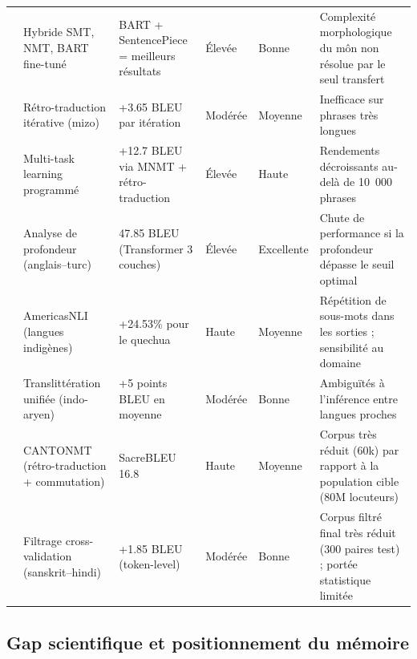 \begin{longtable}{p{2.8cm}p{2.8cm}p{2.2cm}p{1.9cm}p{1.9cm}p{3.2cm}}
\citeauthor{tun2025exploring} \cite{tun2025exploring} &
Hybride SMT, NMT, BART fine-tuné &
BART + \ac{SentencePiece} = meilleurs résultats &
Élevée &
Bonne &
Complexité morphologique du môn non résolue par le seul transfert \\
\citeauthor{ahmed2023guit} \cite{ahmed2023guit} &
Rétro-traduction itérative (mizo) &
+3.65 \ac{BLEU} par itération &
Modérée &
Moyenne &
Inefficace sur phrases très longues \\
\citeauthor{gronroos2020transfer} \cite{gronroos2020transfer} &
Multi-task learning programmé &
+12.7 \ac{BLEU} via \ac{MNMT} + rétro-traduction &
Élevée &
Haute &
Rendements décroissants au-delà de 10~000 phrases \\
\citeauthor{aci2025morphological} \cite{aci2025morphological} &
Analyse de profondeur (anglais--turc) &
47.85 \ac{BLEU} (Transformer 3 couches) &
Élevée &
Excellente &
Chute de performance si la profondeur dépasse le seuil optimal \\
\citeauthor{kann2022americasnli} \cite{kann2022americasnli} &
AmericasNLI (langues indigènes) &
+24.53\% pour le quechua &
Haute &
Moyenne &
Répétition de sous-mots dans les sorties ; sensibilité au domaine \\
\citeauthor{goyal2020efficient} \cite{goyal2020efficient} &
Translittération unifiée (indo-aryen) &
+5 points \ac{BLEU} en moyenne &
Modérée &
Bonne &
Ambiguïtés à l'inférence entre langues proches \\
\citeauthor{hong2024cantonmt} \cite{hong2024cantonmt} &
CANTONMT (rétro-traduction + commutation) &
SacreBLEU 16.8 &
Haute &
Moyenne &
Corpus très réduit (60k) par rapport à la population cible (80M locuteurs) \\
\citeauthor{rani2023filtering} \cite{rani2023filtering} &
Filtrage cross-validation (sanskrit--hindi) &
+1.85 \ac{BLEU} (token-level) &
Modérée &
Bonne &
Corpus filtré final très réduit (300 paires test) ; portée statistique limitée \\
\end{longtable}
\addtocounter{table}{-1}
{\captionsetup{hypcap=false}
\label{tab:synthese_travaux}}
\endgroup


\subsection{Gap scientifique et positionnement du mémoire}

